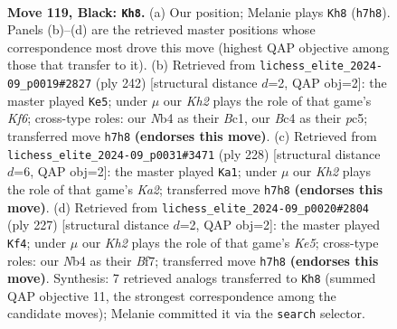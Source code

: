 \documentclass[11pt]{article}
\begin{document}
\clearpage

\begin{figure}[p]\centering
\begin{subfigure}{0.46\textwidth}\centering
\resizebox{\linewidth}{!}{%
\newchessgame
\chessboard[
  setfen={1B6/7k/8/7K/1nb2P2/8/8/8 b - - 2 119},
  showmover=false,
  pgfstyle=straightmove, color=movearrow, markmove={h7-h8}
]}
\caption{}
\end{subfigure}\hfill
\begin{subfigure}{0.46\textwidth}\centering
\resizebox{\linewidth}{!}{%
\newchessgame
\chessboard[
  setfen={8/7k/b4K2/2p5/8/3p4/8/2B5 w - - 0 122},
  showmover=false,
  pgfstyle=straightmove, color=movearrow, markmove={f6-e5}
]}
\caption{}
\end{subfigure}
\\[4pt]
\begin{subfigure}{0.46\textwidth}\centering
\resizebox{\linewidth}{!}{%
\newchessgame
\chessboard[
  setfen={8/8/p7/8/1k6/3b4/K7/8 w - - 40 115},
  showmover=false,
  pgfstyle=straightmove, color=movearrow, markmove={a2-a1}
]}
\caption{}
\end{subfigure}\hfill
\begin{subfigure}{0.46\textwidth}\centering
\resizebox{\linewidth}{!}{%
\newchessgame
\chessboard[
  setfen={8/5b2/2K2P2/8/4k3/2B5/8/8 b - - 42 114},
  showmover=false,
  pgfstyle=straightmove, color=movearrow, markmove={e4-f4}
]}
\caption{}
\end{subfigure}
\caption{\textbf{Move 119, Black: \texttt{Kh8}.} (a) Our position; Melanie plays \texttt{Kh8} (\texttt{h7h8}). Panels (b)--(d) are the retrieved master positions whose correspondence most drove this move (highest QAP objective among those that transfer to it). (b) Retrieved from \texttt{lichess\_elite\_2024-09\_p0019\#2827} (ply 242) [structural distance $d$=2, QAP obj=2]: the master played \texttt{Ke5}; under $\mu$ our \emph{Kh2} plays the role of that game's \emph{Kf6}; cross-type roles: our \emph{N}b4 as their \emph{B}c1, our \emph{B}c4 as their \emph{p}c5; transferred move \texttt{h7h8} \textbf{(endorses this move)}. (c) Retrieved from \texttt{lichess\_elite\_2024-09\_p0031\#3471} (ply 228) [structural distance $d$=6, QAP obj=2]: the master played \texttt{Ka1}; under $\mu$ our \emph{Kh2} plays the role of that game's \emph{Ka2}; transferred move \texttt{h7h8} \textbf{(endorses this move)}. (d) Retrieved from \texttt{lichess\_elite\_2024-09\_p0020\#2804} (ply 227) [structural distance $d$=2, QAP obj=2]: the master played \texttt{Kf4}; under $\mu$ our \emph{Kh2} plays the role of that game's \emph{Ke5}; cross-type roles: our \emph{N}b4 as their \emph{B}f7; transferred move \texttt{h7h8} \textbf{(endorses this move)}. Synthesis: 7 retrieved analogs transferred to \texttt{Kh8} (summed QAP objective 11, the strongest correspondence among the candidate moves); Melanie committed it via the \texttt{search} selector.}
\label{fig:thought-m237}
\end{figure}
\end{document}
